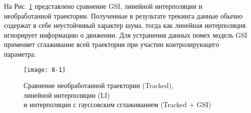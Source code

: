 На Рис. \ref{img:8-1} представлено сравнение GSI, линейной интерполяции и необработанной траектории. Полученные в результате трекинга данные обычно содержат в себе неустойчивый характер шума, тогда как линейная интерполяция игнорирует информацию о движении. Для устранения данных помех модель GSI применяет сглаживание всей траектории при участии контролирующего параметра.

\begin{figure}[ht]
    \centering
    \texttt{[image: 8-1]}
    \caption{Сравнение необработанной траектории (Tracked),\\ линейной интерполяции (LI)\\ и интерполяции с гауссовским сглаживанием (Tracked + GSI)}
    \label{img:8-1}
\end{figure}
